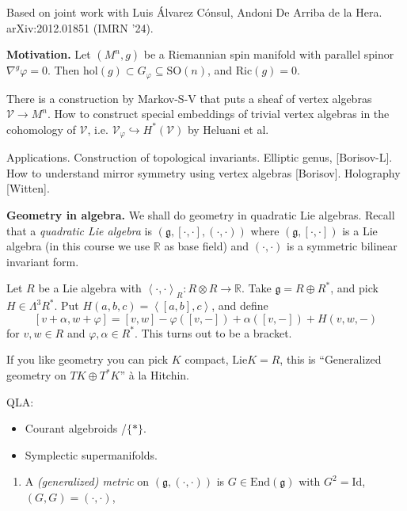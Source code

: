 {\medskip\noindent
Based on joint work with Luis Álvarez Cónsul,
Andoni De Arriba de la Hera. arXiv:2012.01851 (IMRN '24).

\medskip\noindent
{\bf Motivation.}
Let $(M^n,g)$ be a Riemannian spin manifold with
parallel spinor $\nabla^g \varphi=0$.
Then $\text{hol}(g) \subset G_\varphi \subseteq \text{SO}(n)$,
and $\text{Ric}(g)=0$.

There is a construction by Markov-S-V that puts a sheaf
of vertex algebras $\mathcal{V} \to M^n$.
How to construct special embeddings of trivial vertex algebras
in the cohomology of $\mathcal{V}$, i.e.
$\mathcal{V}_\varphi \hookrightarrow H^*(\mathcal{V})$
by Heluani et al.

\medskip\noindent
Applications. Construction of topological invariants.
Elliptic genus, [Borisov-L].
How to understand mirror symmetry using vertex algebras [Borisov].
Holography [Witten].

\medskip\noindent
{\bf Geometry in algebra.}
We shall do geometry in quadratic Lie algebras.
Recall that a {\it quadratic Lie algebra} is
 $(\mathfrak{g},[\cdot,\cdot], (\cdot,\cdot))$ where
$(\mathfrak{g},[\cdot,\cdot])$ is a Lie algebra
(in this course we use $\mathbb{R}$ as base field)
and $(\cdot,\cdot)$ is a symmetric bilinear invariant form.

\begin{example}
\label{example-quadratic-Lie-algebra}
Let $R$ be a Lie algebra with
$\left<\cdot,\cdot\right>_R: R \otimes R \to \mathbb{R}$.
Take $\mathfrak{g}=R \oplus R^*$,
and pick $H \in \Lambda^{3}R^*$.
Put $H(a,b,c)=\left<[a,b],c\right>$, and define
$$
[v+\alpha,w+\varphi]=[v,w]-\varphi([v,-])+\alpha([v,-])+H(v,w,-)
$$
for $v,w \in R$ and $\varphi,\alpha \in R ^*$. This turns out to be a bracket.

If you like geometry you can pick $K$ compact, $\text{Lie}K=R$,
this is ``Generalized geometry on $T K \oplus T^* K$'' 
à la Hitchin.
\end{example}

\medskip\noindent
QLA:
\begin{itemize}
\item Courant algebroids /$\{*\}$.
\item  Symplectic supermanifolds.
\end{itemize}

\medskip\noindent
\begin{definition}
\label{definition-generalizaed}
\begin{enumerate}
\item A {\it (generalized) metric} on $(\mathfrak{g},(\cdot,\cdot))$ is
$G \in \text{End}(\mathfrak{g})$ with $G^2=\text{Id}$, $(G,G)=(\cdot,\cdot)$,


\end{enumerate}
\end{definition}}
